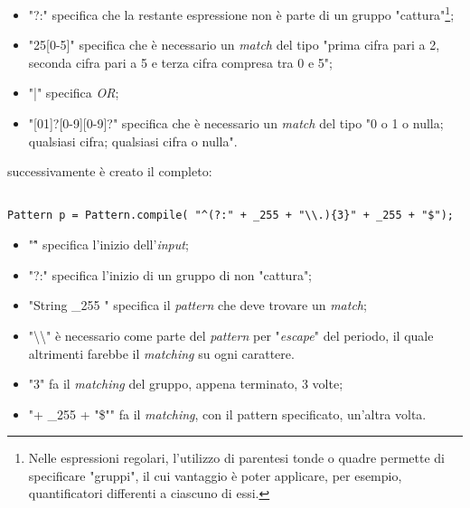 \begin{itemize}

\item "?:" specifica che la restante espressione non \`{e} parte di un gruppo "cattura"\footnote{Nelle espressioni regolari, l'utilizzo di parentesi tonde o quadre permette di specificare "gruppi", il cui vantaggio \`{e} poter applicare, per esempio, quantificatori differenti a ciascuno di essi.};

\item "25[0-5]" specifica che \`{e} necessario un \textit{match} del tipo "prima cifra pari a 2, seconda cifra pari a 5 e terza cifra compresa tra 0 e 5";

\item "|" specifica \textit{OR};

\item "[01]?[0-9][0-9]?" specifica che \`{e} necessario un \textit{match} del tipo "0 o 1 o nulla; qualsiasi cifra; qualsiasi cifra o nulla".

\end{itemize}

successivamente \`{e} creato il  completo:


\vspace{0.5cm}

\begin{lstlisting}

Pattern p = Pattern.compile( "^(?:" + _255 + "\\.){3}" + _255 + "$");

\end{lstlisting}


\begin{itemize}

\item "\^"  specifica l'inizio dell'\textit{input};

\item "?:" specifica l'inizio di un gruppo di non "cattura";

\item "String \_255 " specifica il \textit{pattern} che deve trovare un \textit{match};

\item "\textbackslash\textbackslash "  \`{e} necessario come parte del \textit{pattern} per "\textit{escape}" del periodo, il quale altrimenti farebbe il \textit{matching} su ogni carattere.

\item "{3}" fa il \textit{matching} del gruppo, appena terminato, 3 volte; 

\item "{{+ \_255 + "\$"}}" fa il \textit{matching}, con il pattern specificato, un'altra volta.

\end{itemize}

